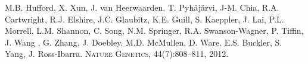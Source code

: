\documentclass[11pt,letterpaper]{article}
\begin{document}
\large{ 
M.B. Hufford, X. Xun, J. van Heerwaarden, T. Pyh\"aj\"arvi, J-M. Chia, R.A. Cartwright, R.J. Elshire, J.C. Glaubitz, K.E. Guill, S. Kaeppler, J. Lai, P.L. Morrell, L.M. Shannon, C. Song, N.M. Springer, R.A. Swanson-Wagner, P. Tiffin, J. Wang , G. Zhang, J. Doebley, M.D. McMullen, D. Ware, E.S. Buckler, S. Yang, J. Ross-Ibarra. 
\textsc{Nature Genetics}, 44(7):808–811, 2012.}


 
\end{document}
